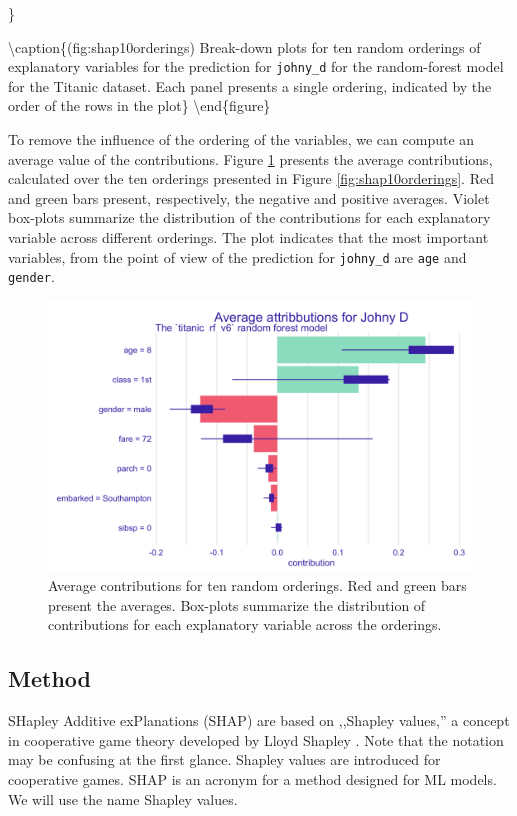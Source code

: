 \documentclass[12pt,]{krantz}
\begin{document}
\}

\textbackslash{}caption\{(fig:shap10orderings) Break-down plots for ten random orderings of explanatory variables for the prediction for \texttt{johny\_d} for the random-forest model for the Titanic dataset. Each panel presents a single ordering, indicated by the order of the rows in the plot\}\label{fig:shap10orderings}
\textbackslash{}end\{figure\}

To remove the influence of the ordering of the variables, we can compute an average value of the contributions.
Figure \ref{fig:shapOrdering} presents the average contributions, calculated over the ten orderings presented in Figure \ref{fig:shap10orderings}. Red and green bars present, respectively, the negative and positive averages. Violet box-plots summarize the distribution of the contributions for each explanatory variable across different orderings. The plot indicates that the most important variables, from the point of view of the prediction for \texttt{johny\_d} are \texttt{age} and \texttt{gender}.

\begin{figure}

{\centering \includegraphics[width=0.7\linewidth]{figure/shap_ordering} 

}

\caption{Average contributions for ten random orderings. Red and green bars present the averages. Box-plots summarize the distribution of contributions for each explanatory variable across the orderings.}\label{fig:shapOrdering}
\end{figure}

\hypertarget{SHAPMethod}{%
\subsection{Method}\label{SHAPMethod}}

SHapley Additive exPlanations (SHAP) are based on ,,Shapley values,'' a concept in cooperative game theory developed by Lloyd Shapley \citep{shapleybook1952}. Note that the notation may be confusing at the first glance. Shapley values are introduced for cooperative games. SHAP is an acronym for a method designed for ML models. We will use the name Shapley values.
\end{document}
